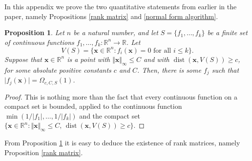 \documentclass[12pt,a4paper,twoside,reqno]{amsart}
\newtheorem{Proposition}[Theorem]{Proposition}
\numberwithin{equation}{section}
\begin{document}
In this appendix we prove the two quantitative statements from earlier in the paper, namely Propositions \ref{rank matrix} and \ref{normal form algorithm}. 
 

\begin{Proposition}
\label{sec.Analysis algebra quant}
Let $n$ be a natural number, and let $S = \{f_1,\dots,f_k\}$ be a finite set of continuous functions $f_1,\dots,f_k:\mathbb{R}^n\longrightarrow \mathbb{R}$. Let \[V(S) = \{\mathbf{x} \in \mathbb{R}^n: f_i(\mathbf{x}) = 0 \text{ for all } i\leqslant k\}.\] Suppose that $\mathbf{x}\in \mathbb{R}^n$ is a point with $\Vert \mathbf{x}\Vert_\infty \leqslant C$ and with $\operatorname{dist}(\mathbf{x},V(S))\geqslant c$, for some absolute positive constants $c$ and $C$. Then, there is some $f_j$ such that $\vert f_j(\mathbf{x})\vert = \Omega_{c,C,S}(1)$.
\end{Proposition} 

\begin{proof}
This is nothing more than the fact that every continuous function on a compact set is bounded, applied to the continuous function $\min (1/\vert f_1\vert,\dots,1/\vert f_k\vert )$ and the compact set $\{\mathbf{x} \in \mathbb{R}^n: \Vert \mathbf{x}\Vert_\infty \leqslant C, \,\operatorname{dist}(\mathbf{x},V(S))\geqslant c\}$. 
\end{proof}

From Proposition \ref{sec.Analysis algebra quant} it is easy to deduce the existence of rank matrices, namely Proposition \ref{rank matrix}.
\end{document}
